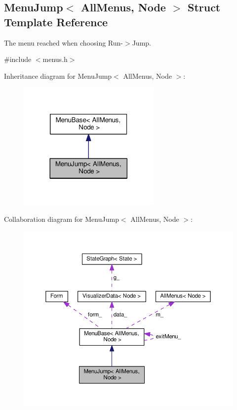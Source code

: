\hypertarget{structMenuJump}{}\subsection{Menu\+Jump$<$ All\+Menus, Node $>$ Struct Template Reference}
\label{structMenuJump}


The menu reached when choosing Run-\/$>$Jump.  




{\ttfamily \#include $<$menus.\+h$>$}



Inheritance diagram for Menu\+Jump$<$ All\+Menus, Node $>$\+:\nopagebreak
\begin{figure}[H]
\begin{center}
\leavevmode
\includegraphics[width=197pt]{structMenuJump__inherit__graph}
\end{center}
\end{figure}


Collaboration diagram for Menu\+Jump$<$ All\+Menus, Node $>$\+:\nopagebreak
\begin{figure}[H]
\begin{center}
\leavevmode
\includegraphics[width=350pt]{structMenuJump__coll__graph}
\end{center}
\end{figure}
